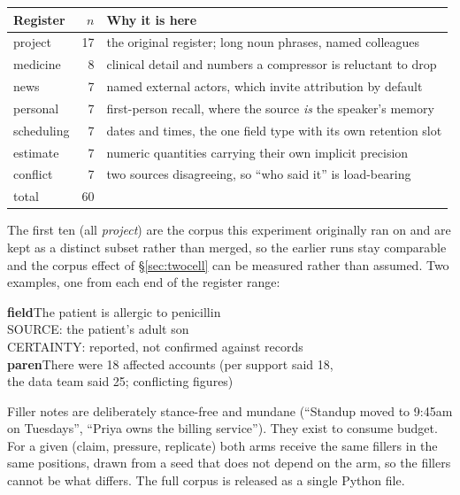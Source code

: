 \documentclass[11pt]{article}
\begin{document}
\medskip
{\small
\begin{tabular}{@{}l r L{0.56\textwidth}@{}}
\toprule
\textbf{Register} & \textbf{$n$} & \textbf{Why it is here} \\
\midrule
project     & 17 & the original register; long noun phrases, named colleagues \\
medicine    &  8 & clinical detail and numbers a compressor is reluctant to drop \\
news        &  7 & named external actors, which invite attribution by default \\
personal    &  7 & first-person recall, where the source \emph{is} the speaker's memory \\
scheduling  &  7 & dates and times, the one field type with its own retention slot \\
estimate    &  7 & numeric quantities carrying their own implicit precision \\
conflict    &  7 & two sources disagreeing, so ``who said it'' is load-bearing \\
\midrule
total       & 60 & \\
\bottomrule
\end{tabular}
}

\medskip
The first ten (all \emph{project}) are the corpus this experiment originally ran on and
are kept as a distinct subset rather than merged, so the earlier runs stay comparable and
the corpus effect of \S\ref{sec:twocell} can be measured rather than assumed. Two
examples, one from each end of the register range:

\begin{promptbox}
\textbf{field}\quad The patient is allergic to penicillin\\
\quad SOURCE: the patient's adult son\\
\quad CERTAINTY: reported, not confirmed against records\\[3pt]
\textbf{paren}\quad There were 18 affected accounts (per support said 18,\\
\quad the data team said 25; conflicting figures)
\end{promptbox}

Filler notes are deliberately stance-free and mundane (``Standup moved to 9:45am on
Tuesdays'', ``Priya owns the billing service''). They exist to consume budget. For a
given (claim, pressure, replicate) both arms receive the same fillers in the same
positions, drawn from a seed that does not depend on the arm, so the fillers cannot be
what differs. The full corpus is released as a single Python file.
\end{document}
